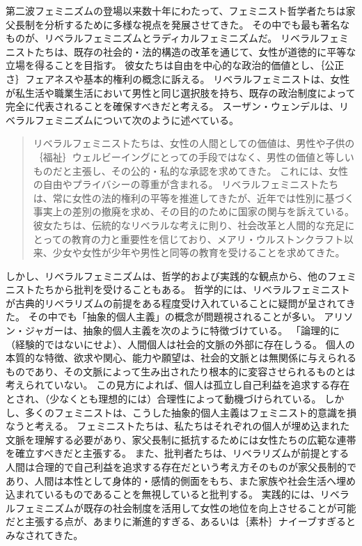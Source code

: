\documentclass[paper=a4,book,openany]{jlreq}
\begin{document}
第二波フェミニズムの登場以来数十年にわたって、フェミニスト哲学者たちは家父長制を分析するために多様な視点を発展させてきた。
その中でも最も著名なものが、リベラルフェミニズムとラディカルフェミニズムだ。
リベラルフェミニストたちは、既存の社会的・法的構造の改革を通じて、女性が道徳的に平等な立場を得ることを目指す。
彼女たちは自由を中心的な政治的価値とし、｛公正さ｝{フェアネス}や基本的権利の概念に訴える。
リベラルフェミニストは、女性が私生活や職業生活において男性と同じ選択肢を持ち、既存の政治制度によって完全に代表されることを確保すべきだと考える。
スーザン・ウェンデルは、リベラルフェミニズムについて次のように述べている。

\begin{quote}
リベラルフェミニストたちは、女性の人間としての価値は、男性や子供の｛福祉｝{ウェルビーイング}にとっての手段ではなく、男性の価値と等しいものだと主張し、その公的・私的な承認を求めてきた。
これには、女性の自由やプライバシーの尊重が含まれる。
リベラルフェミニストたちは、常に女性の法的権利の平等を推進してきたが、近年では性別に基づく事実上の差別の撤廃を求め、その目的のために国家の関与を訴えている。
彼女たちは、伝統的なリベラルな考えに則り、社会改革と人間的な充足にとっての教育の力と重要性を信じており、メアリ・ウルストンクラフト以来、少女や女性が少年や男性と同等の教育を受けることを求めてきた。
\citep[p.66]{wendell87:_qualif_defen_liber_femin}
\end{quote}

しかし、リベラルフェミニズムは、哲学的および実践的な観点から、他のフェミニストたちから批判を受けることもある。
哲学的には、リベラルフェミニストが古典的リベラリズムの前提をある程度受け入れていることに疑問が呈されてきた。
その中でも「抽象的個人主義」の概念が問題視されることが多い。
アリソン・ジャガーは、抽象的個人主義を次のように特徴づけている。
「論理的に（経験的ではないにせよ）、人間個人は社会的文脈の外部に存在しうる。
個人の本質的な特徴、欲求や関心、能力や願望は、社会的文脈とは無関係に与えられるものであり、その文脈によって生み出されたり根本的に変容させられるものとは考えられていない\citep[pp.28-29]{jaggar83:_femin_polit_human_natur}。
この見方によれば、個人は孤立し自己利益を追求する存在とされ、（少なくとも理想的には）合理性によって動機づけられている。
しかし、多くのフェミニストは、こうした抽象的個人主義はフェミニスト的意識を損なうと考える。
フェミニストたちは、私たちはそれぞれの個人が埋め込まれた文脈を理解する必要があり、家父長制に抵抗するためには女性たちの広範な連帯を確立すべきだと主張する。
また、批判者たちは、リベラリズムが前提とする人間は合理的で自己利益を追求する存在だという考え方そのものが家父長制的であり、人間は本性として身体的・感情的側面をもち、また家族や社会生活へ埋め込まれているものであることを無視していると批判する。
実践的には、リベラルフェミニズムが既存の社会制度を活用して女性の地位を向上させることが可能だと主張する点が、あまりに漸進的すぎる、あるいは｛素朴｝{ナイーブ}すぎるとみなされてきた。
\end{document}
